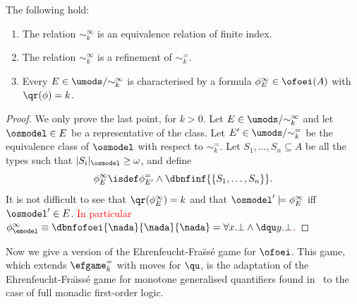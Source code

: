 \begin{proposition}\label{props:eqrelolque} The following hold:
\begin{enumerate}
 pt
\item 
The relation $\sim^\infty_k$ is an equivalence relation of finite index.
\item 
The relation $\sim^\infty_k$ is a refinement of $\sim^=_k$.
\item 
Every $E \in \umods/{\sim^\infty_k}$ is characterised by a formula 
   $\phi^\infty_E \in \ofoei(A)$ with $\qr(\phi) = k$.
	\end{enumerate}
\end{proposition}

\begin{proof}
We only prove the last point, for $k>0$. 
Let $E \in \umods/{\sim^\infty_k}$ and let $\osmodel \in E$ be a representative 
of the class. 
Let $E' \in \umods/{\sim^=_k}$ be the equivalence class of $\osmodel$ with 
respect to $\sim^=_k$.
Let $S_1,\dots,S_n \subseteq A$ be all the types such that $|S_i|_\osmodel \geq 
\omega$, and define
\[
\phi^\infty_E \isdef  \phi^=_{E'} \land \dbnfinf{\{S_1,\dots,S_n\}} .
\]
It is not difficult to see that $\qr(\phi^\infty_E) = k$ and that $\osmodel'
\models \phi^\infty_E$ iff $\osmodel' \in E$.  \textcolor{red}{In particular $\phi^\infty_\emodel \equiv \dbnfofoei{\nada}{\nada}{\nada} = \forall x. \bot \land \dqu y. \bot$.}
\end{proof}

Now we give a version of the Ehrenfeucht-Fra\"ss\'e game for $\ofoei$. 
This game, which extends $\efgame^=_k$ with moves for $\qu$, 
is the
adaptation of the Ehrenfeucht-Fra\"{\i}ss\'e game for monotone generalised 
quantifiers found in~\cite{krawczyk1976ehrenfeucht} %
to the case of full monadic 
first-order logic. 

